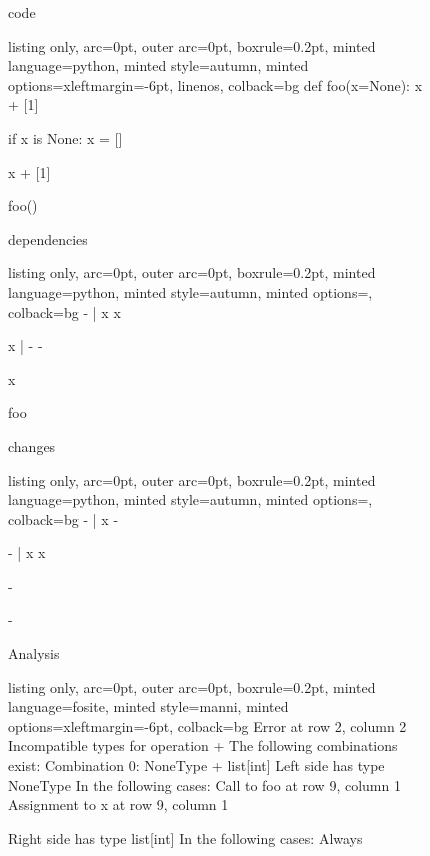 \begin{figure}[!h]
 \begin{minipage}{0.32\textwidth}
 code
 \vspace{2pt}
  \begin{tcblisting}{listing only, 
    arc=0pt,
    outer arc=0pt, 
    boxrule=0.2pt,
    minted language=python,
    minted style=autumn,
    minted options={xleftmargin=-6pt, linenos},
    colback=bg }
def foo(x=None):
  x + [1]

  if x is None:
    x = []

  x + [1]

foo()
\end{tcblisting}
 \end{minipage}
 \begin{minipage}{0.32\textwidth}
 dependencies
  \begin{tcblisting}{listing only, 
    arc=0pt,
    outer arc=0pt, 
    boxrule=0.2pt,
    minted language=python,
    minted style=autumn,
    minted options={},
    colback=bg }
- | x
    x

    x | -
        -

    x

foo
\end{tcblisting}
 \end{minipage}
 \begin{minipage}{0.32\textwidth}
 changes
  \begin{tcblisting}{listing only, 
    arc=0pt,
    outer arc=0pt, 
    boxrule=0.2pt,
    minted language=python,
    minted style=autumn,
    minted options={},
    colback=bg }
- | x
    -

    - | x
        x

    -

-
\end{tcblisting}
 \end{minipage}
 \begin{minipage}{\textwidth}
  \vspace{4pt}
  Analysis
  \begin{tcblisting}{listing only, 
    arc=0pt,
    outer arc=0pt, 
    boxrule=0.2pt,
    minted language=fosite,
    minted style=manni,
    minted options={xleftmargin=-6pt},
    colback=bg }
Error at row 2, column 2
  Incompatible types for operation +
  The following combinations exist:
  Combination 0: NoneType + list[int]
    Left side has type NoneType
    In the following cases:
      Call to foo at row 9, column 1
      Assignment to x at row 9, column 1

    Right side has type list[int]
    In the following cases:
      Always

\end{tcblisting}
 \end{minipage}
 \label{lst:path_exclusion}
\end{figure}